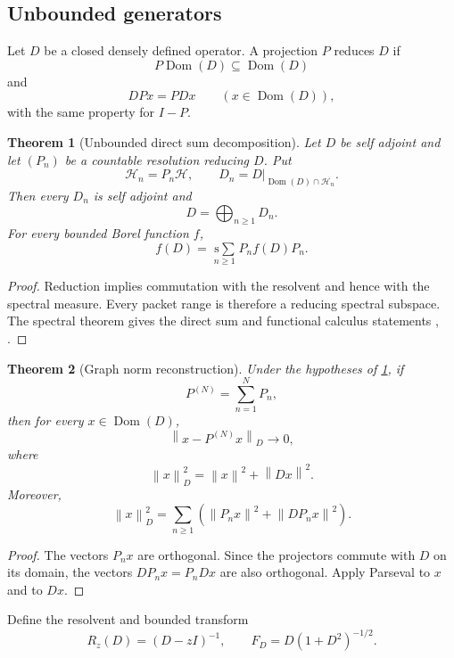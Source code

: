 \documentclass{aomart}
\newtheorem{theorem}{Theorem}[section]
\theoremstyle{definition}
\theoremstyle{remark}
\newcommand{\Hh}{\mathcal H}
\newcommand{\norm}[1]{\left\lVert#1\right\rVert}
\newcommand{\Rcite}[1]{\cite{#1}}
\begin{document}
\subsection{Unbounded generators}

\begin{definition}\label{def:unbounded_reduction}
Let \(D\) be a closed densely defined operator. A projection \(P\) reduces \(D\) if
\[
 P\operatorname{Dom}(D)\subseteq\operatorname{Dom}(D)
\]
and
\[
 DPx=PDx
 \qquad
 (x\in\operatorname{Dom}(D)),
\]
with the same property for \(I-P\).
\end{definition}

\begin{theorem}[Unbounded direct sum decomposition]\label{thm:unbounded_direct_sum}
Let \(D\) be self adjoint and let \((P_n)\) be a countable resolution reducing \(D\). Put
\[
 \Hh_n=P_n\Hh,
 \qquad
 D_n=D|_{\operatorname{Dom}(D)\cap\Hh_n}.
\]
Then every \(D_n\) is self adjoint and
\[
 \boxed{
 D=\bigoplus_{n\ge1}D_n.
 }
\]
For every bounded Borel function \(f\),
\[
 f(D)
 =
 \operatorname*{s\!\!\sum}_{n\ge1}
 P_nf(D)P_n.
\]
\end{theorem}

\begin{proof}
Reduction implies commutation with the resolvent and hence with the spectral measure. Every packet range is therefore a reducing spectral subspace. The spectral theorem gives the direct sum and functional calculus statements \Rcite{R10}, \Rcite{R20}.
\end{proof}

\begin{theorem}[Graph norm reconstruction]\label{thm:graph_norm}
Under the hypotheses of \cref{thm:unbounded_direct_sum}, if
\[
 P^{(N)}=\sum_{n=1}^{N}P_n,
\]
then for every \(x\in\operatorname{Dom}(D)\),
\[
 \norm{x-P^{(N)}x}_D\longrightarrow0,
\]
where
\[
 \norm{x}_D^2=\norm{x}^2+\norm{Dx}^2.
\]
Moreover,
\[
 \norm{x}_D^2
 =
 \sum_{n\ge1}
 \left(
 \norm{P_nx}^2+\norm{DP_nx}^2
 \right).
\]
\end{theorem}

\begin{proof}
The vectors \(P_nx\) are orthogonal. Since the projectors commute with \(D\) on its domain, the vectors \(DP_nx=P_nDx\) are also orthogonal. Apply Parseval to \(x\) and to \(Dx\).
\end{proof}

Define the resolvent and bounded transform
\[
 R_z(D)=(D-zI)^{-1},
 \qquad
 F_D=D(1+D^2)^{-1/2}.
\]
\end{document}

